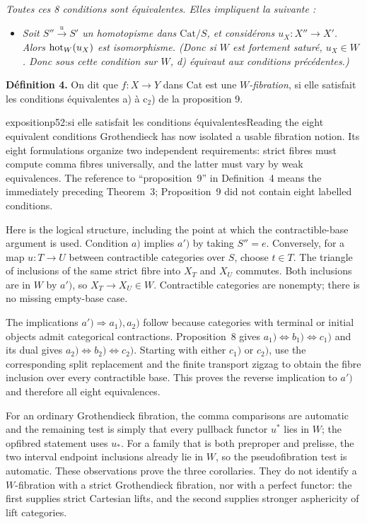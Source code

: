 \textit{Toutes ces 8 conditions sont équivalentes. Elles impliquent la suivante :}

\begin{itemize}[leftmargin=4em]
\item[\textit{d)}] \textit{Soit $S'' \xrightarrow{u} S'$ un homotopisme dans $\mathrm{Cat}/S$, et considérons $u_X : X'' \longrightarrow X'$. Alors $\mathrm{hot}_W(u_X)$ est isomorphisme. (Donc si $W$ est fortement saturé, $u_X \in W$. Donc sous cette condition sur $W$, d) équivaut aux conditions précédentes.)}
\end{itemize}

\textbf{Définition 4.} On dit que $f : X \longrightarrow Y$ dans Cat est une \textit{$W$-fibration}, si elle satisfait les conditions équivalentes a) à c$_2$) de la proposition 9.

\begin{dcomment}{exposition}{p52:si elle satisfait les conditions équivalentes}{Reading the eight equivalent conditions}
Grothendieck has now isolated a usable fibration notion. Its eight formulations organize two independent requirements: strict fibres must compute comma fibres universally, and the latter must vary by weak equivalences. The reference to ``proposition~9'' in Definition~4 means the immediately preceding Theorem~3; Proposition~9 did not contain eight labelled conditions.

Here is the logical structure, including the point at which the contractible-base argument is used. Condition $a)$ implies $a')$ by taking $S''=e$. Conversely, for a map $u:T\to U$ between contractible categories over $S$, choose $t\in T$. The triangle of inclusions of the same strict fibre into $X_T$ and $X_U$ commutes. Both inclusions are in $W$ by $a')$, so $X_T\to X_U\in W$. Contractible categories are nonempty; there is no missing empty-base case.

The implications $a')\Rightarrow a_1),a_2)$ follow because categories with terminal or initial objects admit categorical contractions. Proposition~8 gives $a_1)\Longleftrightarrow b_1)\Longleftrightarrow c_1)$ and its dual gives $a_2)\Longleftrightarrow b_2)\Longleftrightarrow c_2)$. Starting with either $c_1)$ or $c_2)$, use the corresponding split replacement and the finite transport zigzag to obtain the fibre inclusion over every contractible base. This proves the reverse implication to $a')$ and therefore all eight equivalences.

For an ordinary Grothendieck fibration, the comma comparisons are automatic and the remaining test is simply that every pullback functor $u^*$ lies in $W$; the opfibred statement uses $u_*$. For a family that is both preproper and prelisse, the two interval endpoint inclusions already lie in $W$, so the pseudofibration test is automatic. These observations prove the three corollaries. They do not identify a $W$-fibration with a strict Grothendieck fibration, nor with a perfect functor: the first supplies strict Cartesian lifts, and the second supplies stronger asphericity of lift categories.
\end{dcomment}


